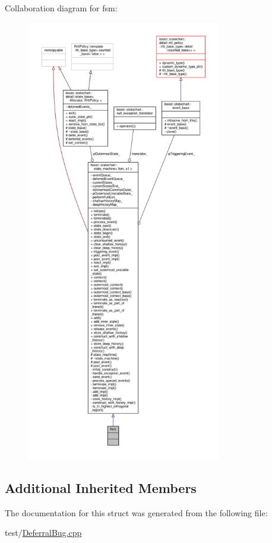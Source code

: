 Collaboration diagram for fsm\+:
\nopagebreak
\begin{figure}[H]
\begin{center}
\leavevmode
\includegraphics[height=550pt]{structfsm__coll__graph}
\end{center}
\end{figure}
\subsection*{Additional Inherited Members}


The documentation for this struct was generated from the following file\+:\begin{DoxyCompactItemize}
\item 
test/\mbox{\hyperlink{_deferral_bug_8cpp}{Deferral\+Bug.\+cpp}}\end{DoxyCompactItemize}
